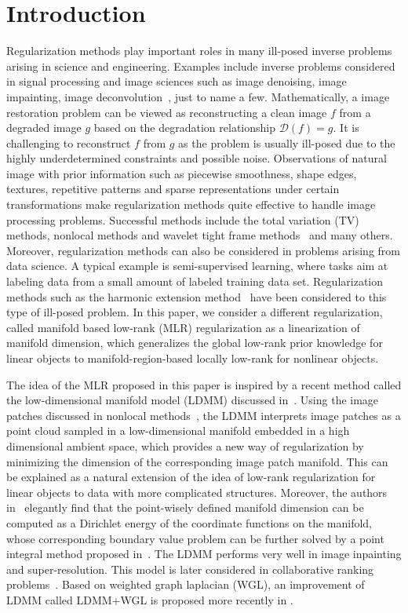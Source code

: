 \documentclass[letterpaper,10pt]{article}
\begin{document}
\section{Introduction}
\label{sec:Intro}
Regularization methods play important roles in many ill-posed inverse problems arising in science and engineering. Examples include inverse problems considered in signal processing and image sciences such as image denoising, image impainting, image deconvolution~\cite{chan2005image,aubert2006mathematical}, just to name a few. Mathematically, a image restoration problem can be viewed as reconstructing a clean image $f$ from a degraded image $g$ based on the degradation relationship $\mathcal{D}(f) = g$. It is challenging to reconstruct $f$ from $g$ as the problem is usually ill-posed due to the highly underdetermined constraints and possible noise. Observations of natural image with prior information such as piecewise smoothness, shape edges, textures, repetitive patterns and sparse representations under certain transformations make regularization methods quite effective to handle image processing problems. Successful methods include the total variation (TV) methods, nonlocal methods and wavelet tight frame methods~\cite{ROF,buades2005non,Gilboa2008,Dong10mra-basedwavelet} and many others.
Moreover, regularization methods can also be considered in problems arising from data science. A typical example is semi-supervised learning, where tasks aim at labeling data from a small amount of labeled training data set. Regularization methods such as the harmonic extension method~\cite{zhu2003semi} have been considered to this type of ill-posed problem. In this paper, we consider a different regularization, called manifold based low-rank (MLR) regularization as a linearization of manifold dimension, which generalizes the global low-rank prior knowledge for linear objects to manifold-region-based locally low-rank for nonlinear objects.


The idea of the MLR proposed in this paper is inspired by a recent method called the low-dimensional manifold model (LDMM) discussed in~\cite{osher2016low}. Using the image patches discussed in nonlocal methods~\cite{buades2005non,peyre2009manifold}, the LDMM interprets image patches as a point cloud sampled in a low-dimensional manifold embedded in a high dimensional ambient space, which provides a new way of regularization by minimizing the dimension of the corresponding image patch manifold. This can be explained as a natural extension of the idea of low-rank regularization for linear objects to data with more complicated structures. Moreover, the authors in~\cite{osher2016low} elegantly find that the point-wisely defined manifold dimension can be computed as a Dirichlet energy of the coordinate functions on the manifold, whose corresponding boundary value problem can be further solved by a point integral method proposed in~\cite{li2014point}. The LDMM performs very well in image inpainting and super-resolution. This model is later considered in collaborative ranking problems~\cite{kuang2016harmonic}. Based on weighted graph laplacian (WGL), an improvement of LDMM called LDMM+WGL is proposed more recently in \cite{shilow}.
\end{document}
